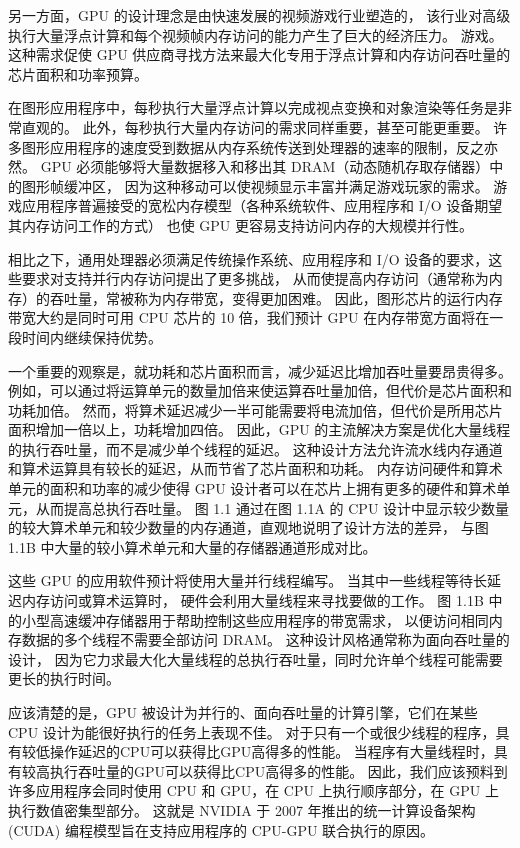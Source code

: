 另一方面，GPU 的设计理念是由快速发展的视频游戏行业塑造的，
该行业对高级执行大量浮点计算和每个视频帧内存访问的能力产生了巨大的经济压力。 游戏。 
这种需求促使 GPU 供应商寻找方法来最大化专用于浮点计算和内存访问吞吐量的芯片面积和功率预算。

在图形应用程序中，每秒执行大量浮点计算以完成视点变换和对象渲染等任务是非常直观的。 
此外，每秒执行大量内存访问的需求同样重要，甚至可能更重要。 
许多图形应用程序的速度受到数据从内存系统传送到处理器的速率的限制，反之亦然。 
GPU 必须能够将大量数据移入和移出其 DRAM（动态随机存取存储器）中的图形帧缓冲区，
因为这种移动可以使视频显示丰富并满足游戏玩家的需求。 
游戏应用程序普遍接受的宽松内存模型（各种系统软件、应用程序和 I/O 设备期望其内存访问工作的方式）
也使 GPU 更容易支持访问内存的大规模并行性。

相比之下，通用处理器必须满足传统操作系统、应用程序和 I/O 设备的要求，这些要求对支持并行内存访问提出了更多挑战，
从而使提高内存访问（通常称为内存）的吞吐量，常被称为内存带宽，变得更加困难。 
因此，图形芯片的运行内存带宽大约是同时可用 CPU 芯片的 10 倍，我们预计 GPU 在内存带宽方面将在一段时间内继续保持优势。

一个重要的观察是，就功耗和芯片面积而言，减少延迟比增加吞吐量要昂贵得多。 
例如，可以通过将运算单元的数量加倍来使运算吞吐量加倍，但代价是芯片面积和功耗加倍。 
然而，将算术延迟减少一半可能需要将电流加倍，但代价是所用芯片面积增加一倍以上，功耗增加四倍。 
因此，GPU 的主流解决方案是优化大量线程的执行吞吐量，而不是减少单个线程的延迟。 
这种设计方法允许流水线内存通道和算术运算具有较长的延迟，从而节省了芯片面积和功耗。 
内存访问硬件和算术单元的面积和功率的减少使得 GPU 设计者可以在芯片上拥有更多的硬件和算术单元，从而提高总执行吞吐量。 
图 1.1 通过在图 1.1A 的 CPU 设计中显示较少数量的较大算术单元和较少数量的内存通道，直观地说明了设计方法的差异，
与图 1.1B 中大量的较小算术单元和大量的存储器通道形成对比。

这些 GPU 的应用软件预计将使用大量并行线程编写。 当其中一些线程等待长延迟内存访问或算术运算时，
硬件会利用大量线程来寻找要做的工作。 图 1.1B 中的小型高速缓冲存储器用于帮助控制这些应用程序的带宽需求，
以便访问相同内存数据的多个线程不需要全部访问 DRAM。 这种设计风格通常称为面向吞吐量的设计，
因为它力求最大化大量线程的总执行吞吐量，同时允许单个线程可能需要更长的执行时间。

应该清楚的是，GPU 被设计为并行的、面向吞吐量的计算引擎，它们在某些 CPU 设计为能很好执行的任务上表现不佳。 
对于只有一个或很少线程的程序，具有较低操作延迟的CPU可以获得比GPU高得多的性能。 
当程序有大量线程时，具有较高执行吞吐量的GPU可以获得比CPU高得多的性能。 
因此，我们应该预料到许多应用程序会同时使用 CPU 和 GPU，在 CPU 上执行顺序部分，在 GPU 上执行数值密集型部分。 
这就是 NVIDIA 于 2007 年推出的统一计算设备架构 (CUDA) 编程模型旨在支持应用程序的 CPU-GPU 联合执行的原因。

